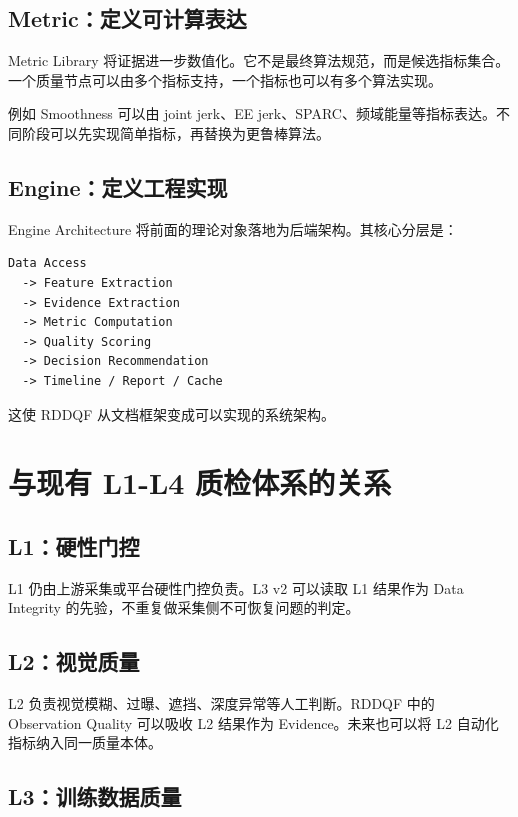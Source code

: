\documentclass[UTF8,zihao=-4,oneside,openany]{ctexrep}
\begin{document}
\subsection{Metric：定义可计算表达}

Metric Library 将证据进一步数值化。它不是最终算法规范，而是候选指标集合。一个质量节点可以由多个指标支持，一个指标也可以有多个算法实现。

例如 Smoothness 可以由 joint jerk、EE jerk、SPARC、频域能量等指标表达。不同阶段可以先实现简单指标，再替换为更鲁棒算法。

\subsection{Engine：定义工程实现}

Engine Architecture 将前面的理论对象落地为后端架构。其核心分层是：

\begin{verbatim}
Data Access
  -> Feature Extraction
  -> Evidence Extraction
  -> Metric Computation
  -> Quality Scoring
  -> Decision Recommendation
  -> Timeline / Report / Cache
\end{verbatim}

这使 RDDQF 从文档框架变成可以实现的系统架构。

\section{与现有 L1-L4 质检体系的关系}

\subsection{L1：硬性门控}

L1 仍由上游采集或平台硬性门控负责。L3 v2 可以读取 L1 结果作为 Data Integrity 的先验，不重复做采集侧不可恢复问题的判定。

\subsection{L2：视觉质量}

L2 负责视觉模糊、过曝、遮挡、深度异常等人工判断。RDDQF 中的 Observation Quality 可以吸收 L2 结果作为 Evidence。未来也可以将 L2 自动化指标纳入同一质量本体。

\subsection{L3：训练数据质量}
\end{document}
